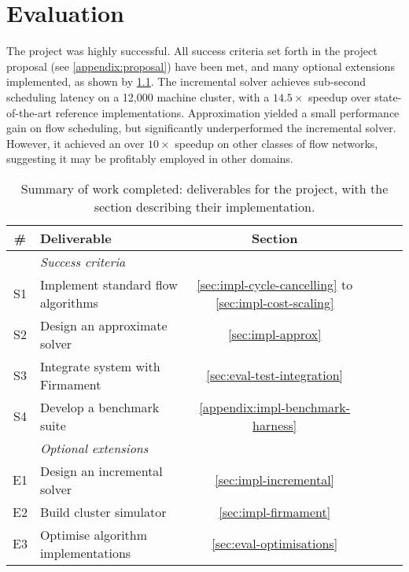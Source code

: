 \chapter{Evaluation} \label{chap:eval}

The project was highly successful. All success criteria set forth in the project proposal (see \cref{appendix:proposal}) have been met, and many optional extensions implemented, as shown by \cref{table:eval-project-requirements}. The incremental solver achieves sub-second scheduling latency on a 12,000 machine cluster, with a $14.5\times$ speedup over state-of-the-art reference implementations. Approximation yielded a small performance gain on flow scheduling, but significantly underperformed the incremental solver. However, it achieved an over $10\times$ speedup on other classes of flow networks, suggesting it may be profitably employed in other domains.

\begin{table}
    \centering
    \begin{tabular}{clcccc}
        \textbf{\#} & \textbf{Deliverable} & \textbf{Section}
        \tabularnewline
        \hline
        & \textit{Success criteria} \tabularnewline
        S1 & Implement standard flow algorithms & \cref{sec:impl-cycle-cancelling} to \cref{sec:impl-cost-scaling} \tabularnewline
        S2 & Design an approximate solver & \cref{sec:impl-approx} \tabularnewline
        S3 & Integrate system with Firmament & \cref{sec:eval-test-integration} \tabularnewline
        S4 & Develop a benchmark suite & \cref{appendix:impl-benchmark-harness} \tabularnewline
        \hline
        & \textit{Optional extensions} \tabularnewline
        E1 & Design an incremental solver & \cref{sec:impl-incremental} \tabularnewline
        E2 & Build cluster simulator & \cref{sec:impl-firmament} \tabularnewline
        E3 & Optimise algorithm implementations & \cref{sec:eval-optimisations} \tabularnewline
        \hline
    \end{tabular}
    \crefsections
    \caption[Summary of work completed]{Summary of work completed: deliverables for the project, with the section describing their implementation.}
    \label{table:eval-project-requirements}
\end{table}

